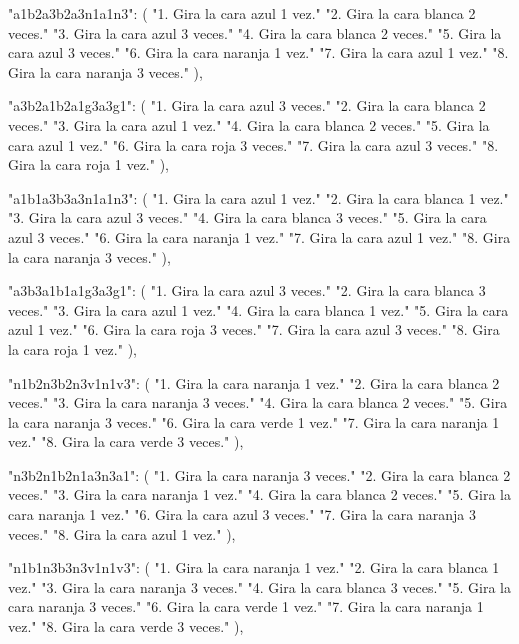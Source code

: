 {{    "a1b2a3b2a3n1a1n3": (
        "1. Gira la cara azul 1 vez.\n"
        "2. Gira la cara blanca 2 veces.\n"
        "3. Gira la cara azul 3 veces.\n"
        "4. Gira la cara blanca 2 veces.\n"
        "5. Gira la cara azul 3 veces.\n"
        "6. Gira la cara naranja 1 vez.\n"
        "7. Gira la cara azul 1 vez.\n"
        "8. Gira la cara naranja 3 veces."
    ),
    
    "a3b2a1b2a1g3a3g1": (
        "1. Gira la cara azul 3 veces.\n"
        "2. Gira la cara blanca 2 veces.\n"
        "3. Gira la cara azul 1 vez.\n"
        "4. Gira la cara blanca 2 veces.\n"
        "5. Gira la cara azul 1 vez.\n"
        "6. Gira la cara roja 3 veces.\n"
        "7. Gira la cara azul 3 veces.\n"
        "8. Gira la cara roja 1 vez."
    ),
    
    "a1b1a3b3a3n1a1n3": (
        "1. Gira la cara azul 1 vez.\n"
        "2. Gira la cara blanca 1 vez.\n"
        "3. Gira la cara azul 3 veces.\n"
        "4. Gira la cara blanca 3 veces.\n"
        "5. Gira la cara azul 3 veces.\n"
        "6. Gira la cara naranja 1 vez.\n"
        "7. Gira la cara azul 1 vez.\n"
        "8. Gira la cara naranja 3 veces."
    ),
    
    "a3b3a1b1a1g3a3g1": (
        "1. Gira la cara azul 3 veces.\n"
        "2. Gira la cara blanca 3 veces.\n"
        "3. Gira la cara azul 1 vez.\n"
        "4. Gira la cara blanca 1 vez.\n"
        "5. Gira la cara azul 1 vez.\n"
        "6. Gira la cara roja 3 veces.\n"
        "7. Gira la cara azul 3 veces.\n"
        "8. Gira la cara roja 1 vez."
    ),
    
    "n1b2n3b2n3v1n1v3": (
        "1. Gira la cara naranja 1 vez.\n"
        "2. Gira la cara blanca 2 veces.\n"
        "3. Gira la cara naranja 3 veces.\n"
        "4. Gira la cara blanca 2 veces.\n"
        "5. Gira la cara naranja 3 veces.\n"
        "6. Gira la cara verde 1 vez.\n"
        "7. Gira la cara naranja 1 vez.\n"
        "8. Gira la cara verde 3 veces."
    ),
    
    "n3b2n1b2n1a3n3a1": (
        "1. Gira la cara naranja 3 veces.\n"
        "2. Gira la cara blanca 2 veces.\n"
        "3. Gira la cara naranja 1 vez.\n"
        "4. Gira la cara blanca 2 veces.\n"
        "5. Gira la cara naranja 1 vez.\n"
        "6. Gira la cara azul 3 veces.\n"
        "7. Gira la cara naranja 3 veces.\n"
        "8. Gira la cara azul 1 vez."
    ),
    
    "n1b1n3b3n3v1n1v3": (
        "1. Gira la cara naranja 1 vez.\n"
        "2. Gira la cara blanca 1 vez.\n"
        "3. Gira la cara naranja 3 veces.\n"
        "4. Gira la cara blanca 3 veces.\n"
        "5. Gira la cara naranja 3 veces.\n"
        "6. Gira la cara verde 1 vez.\n"
        "7. Gira la cara naranja 1 vez.\n"
        "8. Gira la cara verde 3 veces."
    ),
    
}}
